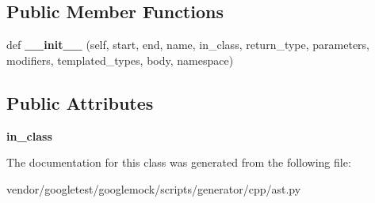 \subsection*{Public Member Functions}
\begin{DoxyCompactItemize}
\item 
\mbox{\label{classcpp_1_1ast_1_1_method_aa3cbdc9c4b7e92b15fa6acea0dbf2322}} 
def {\bfseries \+\_\+\+\_\+init\+\_\+\+\_\+} (self, start, end, name, in\+\_\+class, return\+\_\+type, parameters, modifiers, templated\+\_\+types, body, namespace)
\end{DoxyCompactItemize}
\subsection*{Public Attributes}
\begin{DoxyCompactItemize}
\item 
\mbox{\label{classcpp_1_1ast_1_1_method_aa67244c3673afed43398b5d3e3fa6c1c}} 
{\bfseries in\+\_\+class}
\end{DoxyCompactItemize}


The documentation for this class was generated from the following file\+:\begin{DoxyCompactItemize}
\item 
vendor/googletest/googlemock/scripts/generator/cpp/ast.\+py\end{DoxyCompactItemize}
